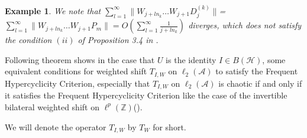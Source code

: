 \documentclass{article}
\newtheorem {example}[theorem]{Example}
\begin{document}
\begin{example}
\textnormal{
We note that $\sum^{\infty}_{l=1}\|W_{j+ln_{k}}\ldots W_{j+1}D^{(k)}_{j}\|$=$\sum^{\infty}_{l=1}\|W_{j+ln_{k}}\ldots
W_{j+1}P_{m}\|=O{( \sum^ {\infty}_{l=1}\frac{1}{j+ln_{k}})}$ diverges, which does not satisfy the condition $(ii)$ of Proposition 3.4 in \cite{I24}.
}
\end{example}

Following theorem shows in the case that $U$ is the identity $I\in B(\mathcal{H})$, some equivalent conditions for weighted shift $T_{I, W}$ on $\ell_{2}(\mathcal{A})$ to satisfy the Frequent Hypercyclicity Criterion, especially that $T_{I, W}$ on $\ell_{2}(\mathcal{A})$ is chaotic if and only if it satisfies the Frequent Hypercyclicity Criterion like the case of the invertible bilateral weighted shift on $\ell^{p}(\mathbb{Z})$(\cite{BR15}).

 We will denote the operator $T_{I,W}$ by $T_{W}$ for short.
\end{document}
